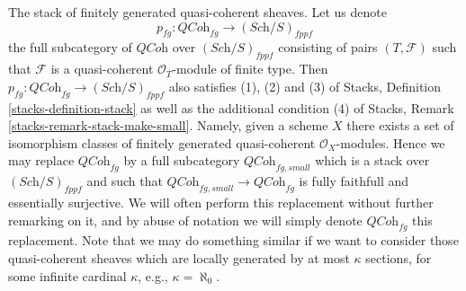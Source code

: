 \begin{example}
\label{example-stack-of-finitely-generated-quasi-coherent-sheaves}
The stack of finitely generated quasi-coherent sheaves.
Let us denote
$$
p_{fg} : \textit{QCoh}_{fg} \to (\textit{Sch}/S)_{fppf}
$$
the full subcategory of $\textit{QCoh}$ over $(\textit{Sch}/S)_{fppf}$ 
consisting of pairs $(T, \mathcal{F})$ such that $\mathcal{F}$
is a quasi-coherent $\mathcal{O}_T$-module of finite type. Then
$p_{fg} : \textit{QCoh}_{fg} \to (\textit{Sch}/S)_{fppf}$
also satisfies (1), (2) and (3) of
Stacks, Definition \ref{stacks-definition-stack}
as well as the additional condition (4) of
Stacks, Remark \ref{stacks-remark-stack-make-small}.
Namely, given a scheme $X$ there exists a set of isomorphism classes
of finitely generated quasi-coherent $\mathcal{O}_X$-modules.
Hence we may replace $\textit{QCoh}_{fg}$ by a full subcategory
$\textit{QCoh}_{fg, small}$
which is a stack over $(\textit{Sch}/S)_{fppf}$ and such that
$\textit{QCoh}_{fg, small} \to \textit{QCoh}_{fg}$ is
fully faithfull and essentially surjective.
We will often perform this replacement without further
remarking on it, and by abuse of notation we will simply denote
$\textit{QCoh}_{fg}$ this replacement. Note that we may do
something similar if we want to consider those quasi-coherent sheaves
which are locally generated by at most $\kappa$ sections, for some
infinite cardinal $\kappa$, e.g., $\kappa = \aleph_0$.
\end{example}

